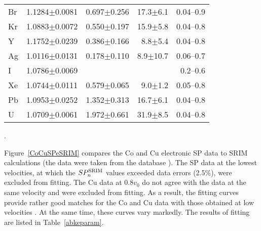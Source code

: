 \documentclass[aps,pra,twocolumn,amsmath,amssymb,floatfix]{revtex4-2}
\begin{document}
\begin{table}[!h]
\begin{ruledtabular}
\begin{tabular}{lccrr}
  Br                                     & 1.1284$\pm$0.0081 & 0.697$\pm$0.256     & 17.3$\pm$6.1      &   0.04--0.9  \\
  Kr\footnotemark[5]   & 1.0883$\pm$0.0072 & 0.550$\pm$0.197     & 15.9$\pm$5.8      &   0.04--0.8  \\
   Y                                      & 1.1752$\pm$0.0239 &0.386$\pm$0.166      &   8.8$\pm$5.4      &   0.04--0.8  \\
  Ag                                    & 1.0116$\pm$0.0131 & 0.178$\pm$0.110     &    8.9$\pm$10.7   &   0.06--0.7  \\
    I                                     & 1.0786$\pm$0.0069 &                                          &                                   &    0.2--0.6    \\
  Xe                                    & 1.0744$\pm$0.0111 & 0.579$\pm$0.065     &    9.0$\pm$1.2      &   0.05--0.8   \\
  Pb                                    & 1.0953$\pm$0.0252 & 1.352$\pm$0.313     & 16.7$\pm$6.1      &   0.04--0.8   \\
   U                                     & 1.0709$\pm$0.0061 & 1.972$\pm$0.661     & 31.9$\pm$8.5      &   0.04--0.8   \\
\end{tabular}
\end{ruledtabular}
.
\end{table}

Figure~\ref{CoCuSPeSRIM} compares the Co and Cu electronic SP data \cite{Zhang2002,Hvelp68,Lennard86,Abdess92,ShyKum96,Harikumar96,Harikumar97} to SRIM calculations (the data \cite{Zhang2002} were taken from the database \cite{IAEASP}). The SP data \cite{Zhang2002} at the lowest velocities, at which the $SP_{n}^{\rm SRIM}$ values exceeded data errors (2.5\%), were excluded from fitting. The Cu data at $0.8v_{0}$ \cite{Lennard86} do not agree with the data \cite{Hvelp68} at the same velocity and were excluded from fitting. As a result, the fitting curves provide rather good matches for the Co and Cu data \cite{Zhang2002} with those obtained at low velocities \cite{Hvelp68}. At the same time, these curves vary markedly. The results of fitting are listed in Table~\ref{abkeparam}.
\end{document}

